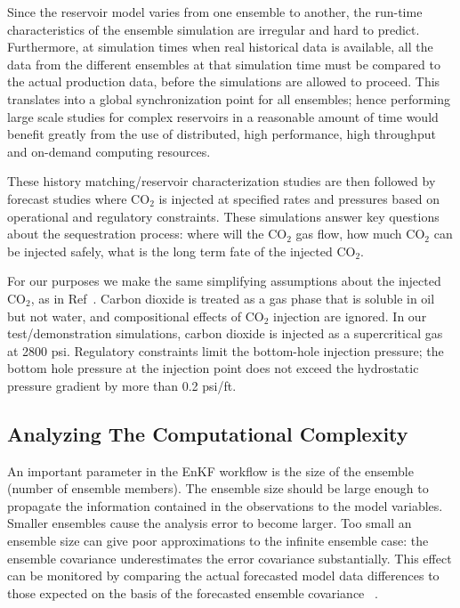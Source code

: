 \documentclass{acm_proc_article-sp}
\newcommand{\up}{\vspace*{-0.3em}}
\begin{document}
Since the reservoir model varies from one ensemble to another, the
run-time characteristics of the ensemble simulation are irregular and
hard to predict. Furthermore, at simulation times when real historical
data is available, all the data from the different ensembles at that
simulation time must be compared to the actual production data, before
the simulations are allowed to proceed. This translates into a global
synchronization point for all ensembles; hence performing large scale
studies for complex reservoirs in a reasonable amount of time would
benefit greatly from the use of distributed, high performance, high
throughput and on-demand computing resources.

These history matching/reservoir characterization studies are then
followed by forecast studies where CO$_2$ is injected at specified
rates and pressures based on operational and regulatory constraints.
These simulations answer key questions about the sequestration
process: where will the CO$_2$ gas flow, how much CO$_2$ can be
injected safely, what is the long term fate of the injected CO$_2$.

For our purposes we make the same simplifying assumptions about the
injected CO$_2$, as in Ref~\cite{Pawar}. Carbon dioxide is treated as
a gas phase that is soluble in oil but not water, and compositional
effects of CO$_2$ injection are ignored. In our test/demonstration
simulations, carbon dioxide is injected as a supercritical gas at 2800
psi. Regulatory constraints limit the bottom-hole injection pressure;
the bottom hole pressure at the injection point does not exceed the
hydrostatic pressure gradient by more than 0.2 psi/ft.
\up\up\up
\subsection{Analyzing The Computational Complexity}



An important parameter in the EnKF workflow is the size of the
ensemble (number of ensemble members). The ensemble size should be
large enough to propagate the information contained in the
observations to the model variables. Smaller ensembles cause the
analysis error to become larger. Too small an ensemble size can give
poor approximations to the infinite ensemble case: the ensemble
covariance underestimates the error covariance substantially. This
effect can be monitored by comparing the actual forecasted model data
differences to those expected on the basis of the forecasted ensemble
covariance ~\cite{Burger98}.
\end{document}
